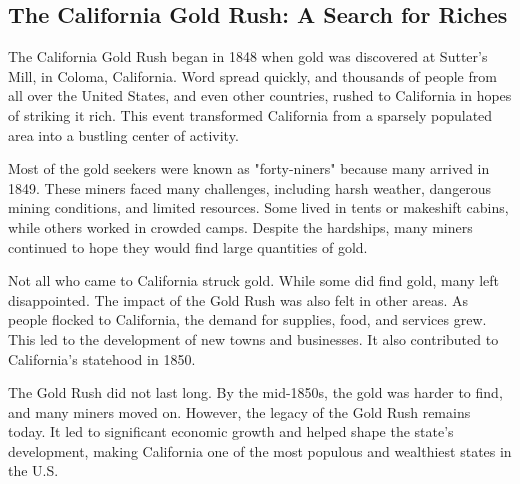 \documentclass[12pt]{article}
\begin{document}
\onehalfspacing

\subsection*{The California Gold Rush: A Search for Riches}
\begin{tcolorbox}[colframe=black!40, colback=gray!5]
\begin{spacing}{1.15}
    The California Gold Rush began in 1848 when gold was discovered at Sutter's Mill, in Coloma, California. Word spread quickly, and thousands of people from all over the United States, and even other countries, rushed to California in hopes of striking it rich. This event transformed California from a sparsely populated area into a bustling center of activity.

    Most of the gold seekers were known as "forty-niners" because many arrived in 1849. These miners faced many challenges, including harsh weather, dangerous mining conditions, and limited resources. Some lived in tents or makeshift cabins, while others worked in crowded camps. Despite the hardships, many miners continued to hope they would find large quantities of gold.

    Not all who came to California struck gold. While some did find gold, many left disappointed. The impact of the Gold Rush was also felt in other areas. As people flocked to California, the demand for supplies, food, and services grew. This led to the development of new towns and businesses. It also contributed to California's statehood in 1850.

    The Gold Rush did not last long. By the mid-1850s, the gold was harder to find, and many miners moved on. However, the legacy of the Gold Rush remains today. It led to significant economic growth and helped shape the state's development, making California one of the most populous and wealthiest states in the U.S.
\end{spacing}
\end{tcolorbox}

\end{document}
